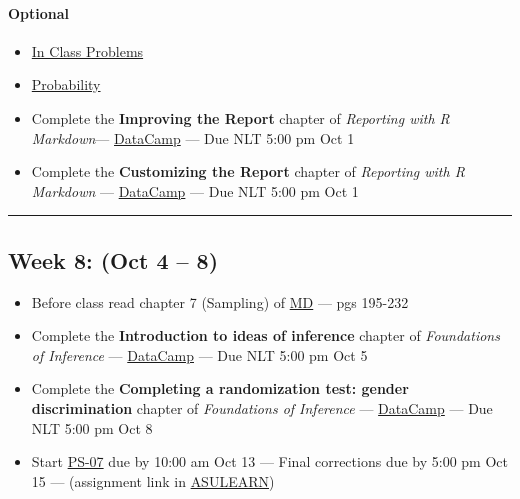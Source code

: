 \documentclass[
]{article}
\begin{document}
\begin{rmdoptional}
\hypertarget{optional}{%
\paragraph*{Optional}\label{optional}}

\begin{itemize}
\item
  \href{../Slides/ProbabilityProblems.html}{In Class Problems}
\item
  \href{https://alanarnholt.github.io/GeneralStatistics/rmarkdown/probability.html}{Probability}
\item
  Complete the \textbf{Improving the Report} chapter of \emph{Reporting
  with R Markdown}---
  \href{https://app.datacamp.com/groups/stt3850-fall2021/assignments}{DataCamp}
  --- Due NLT 5:00 pm Oct 1
\item
  Complete the \textbf{Customizing the Report} chapter of
  \emph{Reporting with R Markdown} ---
  \href{https://app.datacamp.com/groups/stt3850-fall2021/assignments}{DataCamp}
  --- Due NLT 5:00 pm Oct 1
\end{itemize}
\end{rmdoptional}

\begin{center}\rule{0.5\linewidth}{0.5pt}\end{center}

\hypertarget{week-8-oct-4-8}{%
\subsection*{Week 8: (Oct 4 -- 8)}\label{week-8-oct-4-8}}

\begin{itemize}
\item
  Before class read chapter 7 (Sampling) of
  \href{https://moderndive.com}{MD} --- pgs 195-232
\item
  Complete the \textbf{Introduction to ideas of inference} chapter of
  \emph{Foundations of Inference} ---
  \href{https://app.datacamp.com/groups/stt3850-fall2021/assignments}{DataCamp}
  --- Due NLT 5:00 pm Oct 5
\item
  Complete the \textbf{Completing a randomization test: gender
  discrimination} chapter of \emph{Foundations of Inference} ---
  \href{https://app.datacamp.com/groups/stt3850-fall2021/assignments}{DataCamp}
  --- Due NLT 5:00 pm Oct 8
\item
  Start
  \href{https://classroom.github.com/classrooms/87543903-stt3850-fall2021}{PS-07}
  due by 10:00 am Oct 13 --- Final corrections due by 5:00 pm Oct 15 ---
  (assignment link in
  \href{https://asulearn.appstate.edu/course/view.php?id=131169}{ASULEARN})
\end{itemize}
\end{document}
